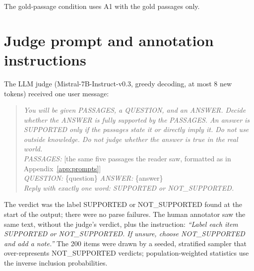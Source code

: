 The gold-passage condition uses A1 with the gold passages only.

\section{Judge prompt and annotation instructions}\label{app:judge}
The LLM judge (Mistral-7B-Instruct-v0.3, greedy decoding, at most 8 new tokens) received one user message:

\begin{quote}\small
\emph{You will be given PASSAGES, a QUESTION, and an ANSWER. Decide whether the ANSWER is fully supported by the PASSAGES. An answer is SUPPORTED only if the passages state it or directly imply it. Do not use outside knowledge. Do not judge whether the answer is true in the real world.}\\
\emph{PASSAGES:} [the same five passages the reader saw, formatted as in Appendix~\ref{app:prompts}]\\
\emph{QUESTION:} \{question\} \quad \emph{ANSWER:} \{answer\}\\
\emph{Reply with exactly one word: SUPPORTED or NOT\_SUPPORTED.}
\end{quote}

The verdict was the label SUPPORTED or NOT\_SUPPORTED found at the start of the output; there were no parse failures. The human annotator saw the same text, without the judge's verdict, plus the instruction: \emph{``Label each item SUPPORTED or NOT\_SUPPORTED. If unsure, choose NOT\_SUPPORTED and add a note.''} The 200 items were drawn by a seeded, stratified sampler that over-represents NOT\_SUPPORTED verdicts; population-weighted statistics use the inverse inclusion probabilities.

